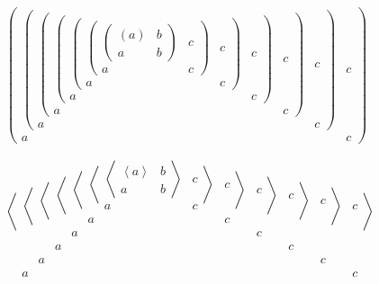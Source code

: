 \documentclass{article}
\begin{document}
\begin{flushleft}
$
\left(\begin{array}{cc}%
\left(\begin{array}{cc}%
\left(\begin{array}{cc}%
\left(\begin{array}{cc}%
\left(\begin{array}{cc}%
\left(\begin{array}{cc}%
\left(\begin{array}{cc}%
(a)&b\\a&b%
\end{array}\right)&c\\a&c%
\end{array}\right)&c\\a&c%
\end{array}\right)&c\\a&c%
\end{array}\right)&c\\a&c%
\end{array}\right)&c\\a&c%
\end{array}\right)&c\\a&c%
\end{array}\right)
$
\\[2ex]

$
\left<\begin{array}{cc}%
\left<\begin{array}{cc}%
\left<\begin{array}{cc}%
\left<\begin{array}{cc}%
\left<\begin{array}{cc}%
\left<\begin{array}{cc}%
\left<\begin{array}{cc}%
\left<a\right>&b\\a&b%
\end{array}\right>&c\\a&c%
\end{array}\right>&c\\a&c%
\end{array}\right>&c\\a&c%
\end{array}\right>&c\\a&c%
\end{array}\right>&c\\a&c%
\end{array}\right>&c\\a&c%
\end{array}\right>
$
\end{flushleft}
\end{document}
